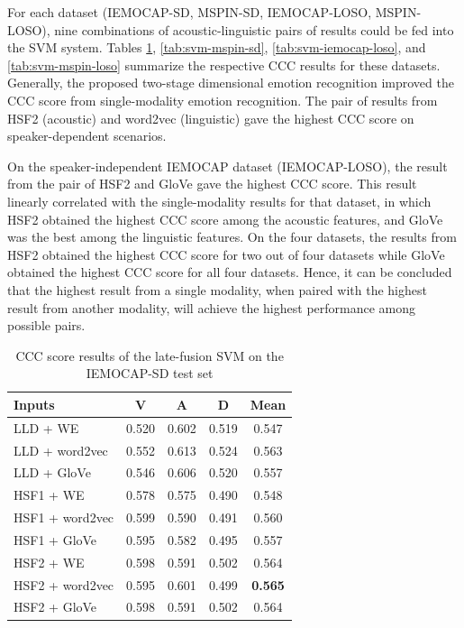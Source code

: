 For each dataset (IEMOCAP-SD, MSPIN-SD, IEMOCAP-LOSO, MSPIN-LOSO), nine
combinations of acoustic-linguistic pairs of results could be fed into the SVM
system.  Tables \ref{tab:svm-iemocap-sd}, \ref{tab:svm-mspin-sd},
\ref{tab:svm-iemocap-loso}, and \ref{tab:svm-mspin-loso} summarize the
respective CCC results for these datasets. Generally, the proposed two-stage
dimensional emotion recognition improved the CCC score from single-modality
emotion recognition. The pair of results from HSF2 (acoustic) and word2vec
(linguistic) gave the highest CCC score on speaker-dependent scenarios.

On the speaker-independent IEMOCAP dataset (IEMOCAP-LOSO), the result from the
pair of HSF2 and GloVe gave the highest CCC score. This result linearly
correlated with the single-modality results for that dataset, in which HSF2
obtained the highest CCC score among the acoustic features, and GloVe was the
best among the linguistic features. On the four datasets, the results from HSF2
obtained the highest CCC score for two out of four datasets while GloVe
obtained the highest CCC score for all four datasets. Hence, it can be
concluded that the highest result from a single modality, when paired with the
highest result from another modality, will achieve the highest performance
among possible pairs.

\begin{table}[htpb]
\caption{CCC score results of the late-fusion SVM on the IEMOCAP-SD test set}
\begin{center}
 \label{tab:svm-iemocap-sd}
 \begin{tabular}{l c c c c}
 \hline
Inputs & V & A & D & Mean \\
\hline \hline
LLD    + WE        & 0.520 & 0.602 & 0.519 & 0.547 \\
LLD    + word2vec  & 0.552 & 0.613 & 0.524 & 0.563 \\
LLD    + GloVe     & 0.546 & 0.606 & 0.520 & 0.557 \\
HSF1   + WE        & 0.578 & 0.575 & 0.490 & 0.548 \\
HSF1   + word2vec  & 0.599 & 0.590 & 0.491 & 0.560 \\
HSF1   + GloVe     & 0.595 & 0.582 & 0.495 & 0.557 \\
HSF2   + WE        & 0.598 & 0.591 & 0.502 & 0.564 \\
HSF2   + word2vec  & 0.595 & 0.601 & 0.499 & \textbf{0.565} \\
HSF2   + GloVe     & 0.598 & 0.591 & 0.502 & 0.564 \\ 
 \hline
 \end{tabular}
\end{center}
\end{table} 


